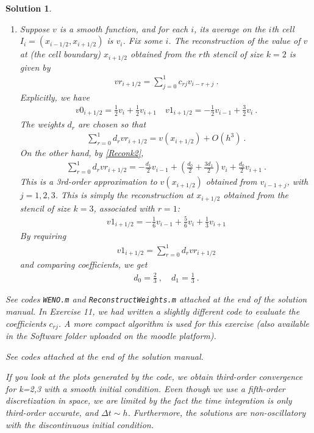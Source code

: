 \documentclass[10pt,letterpaper]{article}
\newcommand{\wt}{} %
\newcommand{\ol}{} %
\newcommand{\hpar}{} %
\newcommand{\rb}[1]{ \left(  {#1} \right) }
\newcommand{\frb}[1]{ \left(  {#1} \right) }
\theoremstyle{break}
\newtheorem{mysolution}{Solution}
\newenvironment{solution}{\begin{mysolution}}{\end{mysolution}}
\begin{document}
\begin{solution}
\begin{enumerate}
\item
Suppose $v$ is a smooth function, and for each $i$, its average on the $i$th cell $I_i=(x_{i-1/2},x_{i+1/2})$ is $\ol v_i$.
Fix some $i$. The reconstruction of the value of $v$ at (the cell boundary) $x_{i+1/2}$ obtained from the $r$th stencil of size $k=2$ is given by
\begin{gather}
	v\hpar{r}_{i+1/2}=\sum_{j=0}^1 c_{rj}\ol v_{i-r+j}\ .
\end{gather}
Explicitly, we have
\begin{gather} \label{Reconk2}
	v\hpar{0}_{i+1/2}=\frac{1}{2}\ol v_{i}+\frac{1}{2}\ol v_{i+1}
	\quad
	v\hpar{1}_{i+1/2}=-\frac{1}{2}\ol v_{i-1}+\frac{3}{2}\ol v_{i}\ .
\end{gather}
The weights $d_r$ are chosen so that
\begin{gather}
	\sum_{r=0}^1 d_r v\hpar{r}_{i+1/2}=v\frb{x_{i+1/2}}+O\frb{h^3}\ .
\end{gather}
On the other hand, by \eqref{Reconk2},
\begin{gather}
	\sum_{r=0}^1 d_r v\hpar{r}_{i+1/2}
		=-\frac{d_1}{2}\ol v_{i-1}+\rb{\frac{d_0}{2}+\frac{3d_1}{2}}\ol v_{i}+\frac{d_0}{2}\ol v_{i+1}\ .
\end{gather}
This is a 3rd-order approximation to $v\frb{x_{i+1/2}}$ obtained from $\ol v_{i-1+j}$, with $j=1,2,3$.
This is simply the reconstruction at $x_{i+1/2}$ obtained from the stencil of size $k=3$, associated with $r=1$:
\begin{gather}
	\wt v\hpar{1}_{i+1/2}=-\frac{1}{6}\ol v_{i-1}+\frac{5}{6}\ol v_{i} +\frac{1}{3}\ol v_{i+1}
\end{gather}
By requiring
\begin{gather}
	\wt v\hpar{1}_{i+1/2}=\sum_{r=0}^1 d_r v\hpar{r}_{i+1/2}
\end{gather}
and comparing coefficients, we get
\begin{gather}
	d_0=\frac{2}{3}\ ,
	\quad
	d_1=\frac{1}{3}\ .
\end{gather}


\end{enumerate}

\item See codes {\tt WENO.m} and {\tt ReconstructWeights.m} attached at the end of the solution manual. In Exercise 11, we had written a slightly different code to evaluate the coefficients $c_{rj}$. A more compact algorithm is used for this exercise (also available in the Software folder uploaded on the moodle platform).

\item See codes attached at the end of the solution manual.

\item If you look at the plots generated by the code, we obtain third-order convergence for k=2,3 with a smooth initial condition. Even though we use a fifth-order discretization in space, we are limited by the fact the time integration is only third-order accurate, and $\Delta t \sim h$. Furthermore, the solutions are non-oscillatory with the discontinuous initial condition.

\end{solution}
\end{document}
